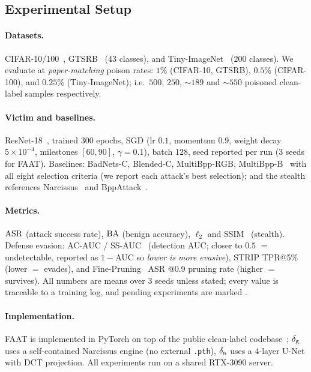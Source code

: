 \subsection{Experimental Setup}
\label{sec:setup}

\paragraph{Datasets.}
CIFAR-10/100~\cite{krizhevsky2009cifar}, GTSRB~\cite{stallkamp2012gtsrb} (43
classes), and Tiny-ImageNet~\cite{le2015tinyimagenet,deng2009imagenet} (200
classes).
We evaluate at \emph{paper-matching} poison rates: $1\%$ (CIFAR-10, GTSRB),
$0.5\%$ (CIFAR-100), and $0.25\%$ (Tiny-ImageNet); i.e.\ $500$, $250$,
$\sim$$189$ and $\sim$$550$ poisoned clean-label samples respectively.

\paragraph{Victim and baselines.}
ResNet-18~\cite{he2016resnet}, trained $300$ epochs, SGD (lr $0.1$, momentum
$0.9$, weight decay $5\!\times\!10^{-4}$, milestones $[60,90]$, $\gamma\!=\!0.1$),
batch $128$, seed reported per run (3 seeds for FAAT). Baselines: BadNets-C,
Blended-C, MultiBpp-RGB, MultiBpp-B~\cite{generalcomponents2025} with all eight
selection criteria (we report each attack's best selection); and the stealth
references Narcissus~\cite{zeng2023narcissus} and BppAttack~\cite{wang2022bppattack}.

\paragraph{Metrics.}
$\mathrm{ASR}$ (attack success rate), $\mathrm{BA}$ (benign accuracy), $\ell_2$ and
SSIM~\cite{wang2004ssim} (stealth). Defense evasion:
AC-AUC / SS-AUC~\cite{chen2018activation,tran2018spectral} (detection AUC;
closer to $0.5$ $=$ undetectable, reported as $1{-}$AUC so \emph{lower is more
evasive}), STRIP TPR@5\%~\cite{gao2019strip} (lower $=$ evades), and
Fine-Pruning~\cite{liu2018finepruning} ASR @0.9 pruning rate (higher $=$ survives).
All numbers are means over 3 seeds unless stated; every value is traceable to a
training log, and pending experiments are marked \na.

\paragraph{Implementation.}
FAAT is implemented in PyTorch on top of the public clean-label
codebase~\cite{generalcomponents2025}; $\delta_{\mathrm{g}}$ uses a self-contained Narcissus
engine (no external \texttt{.pth}), $\delta_{\mathrm{a}}$ uses a $4$-layer U-Net with DCT
projection. All experiments run on a shared RTX-3090 server.
